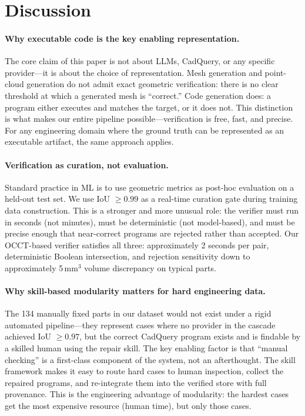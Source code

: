 \section{Discussion}
\label{sec:discussion}

\paragraph{Why executable code is the key enabling representation.}
The core claim of this paper is not about LLMs, CadQuery, or any specific provider---it is about the choice of representation.
Mesh generation and point-cloud generation do not admit exact geometric verification: there is no clear threshold at which a generated mesh is ``correct.''
Code generation does: a program either executes and matches the target, or it does not.
This distinction is what makes our entire pipeline possible---verification is free, fast, and precise.
For any engineering domain where the ground truth can be represented as an executable artifact, the same approach applies.

\paragraph{Verification as curation, not evaluation.}
Standard practice in ML is to use geometric metrics as post-hoc evaluation on a held-out test set.
We use IoU $\geq 0.99$ as a real-time curation gate during training data construction.
This is a stronger and more unusual role: the verifier must run in seconds (not minutes), must be deterministic (not model-based), and must be precise enough that near-correct programs are rejected rather than accepted.
Our OCCT-based verifier satisfies all three: approximately 2 seconds per pair, deterministic Boolean intersection, and rejection sensitivity down to approximately 5\,mm$^3$ volume discrepancy on typical parts.

\paragraph{Why skill-based modularity matters for hard engineering data.}
The 134 manually fixed parts in our dataset would not exist under a rigid automated pipeline---they represent cases where no provider in the cascade achieved IoU $\geq 0.97$, but the correct CadQuery program exists and is findable by a skilled human using the repair skill.
The key enabling factor is that ``manual checking'' is a first-class component of the system, not an afterthought.
The skill framework makes it easy to route hard cases to human inspection, collect the repaired programs, and re-integrate them into the verified store with full provenance.
This is the engineering advantage of modularity: the hardest cases get the most expensive resource (human time), but only those cases.

